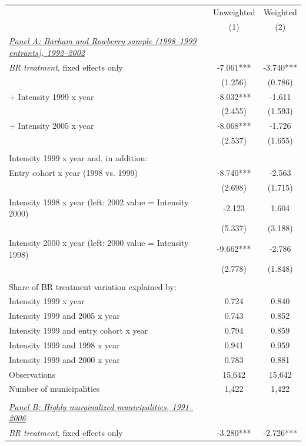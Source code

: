 \begin{tabular}{lcc} \hline \hline
 & Unweighted & Weighted \\ 
 & (1) & (2) \\ \toprule
\underline{\textit{Panel A: Barham and Rowberry sample (1998--1999 entrants), 1992--2002}} \\ 
\textit{BR treatment}, fixed effects only & -7.061*** & -3.740*** \\ 
 & (1.256) & (0.786) \\ 
\quad + Intensity 1999 x year & -8.032*** & -1.611 \\ 
 & (2.455) & (1.593) \\ 
\quad + Intensity 2005 x year & -8.068*** & -1.726 \\ 
 & (2.537) & (1.655) \\ 
  & & \\ 
Intensity 1999 x year and, in addition: & & \\ 
\quad Entry cohort x year (1998 vs. 1999) & -8.740*** & -2.563 \\ 
 & (2.698) & (1.715) \\ 
\quad Intensity 1998 x year (left: 2002 value = Intensity 2000) & -2.123 & 1.604 \\ 
 & (5.337) & (3.188) \\ 
\quad Intensity 2000 x year (left: 2000 value = Intensity 1998) & -9.662*** & -2.786 \\ 
 & (2.778) & (1.848) \\ 
  & & \\ 
Share of BR treatment variation explained by: & & \\ 
\quad Intensity 1999 x year & 0.724 & 0.840 \\ 
\quad Intensity 1999 and 2005 x year & 0.743 & 0.852 \\ 
\quad Intensity 1999 and entry cohort x year & 0.794 & 0.859 \\ 
\quad Intensity 1999 and 1998 x year & 0.941 & 0.959 \\ 
\quad Intensity 1999 and 2000 x year & 0.783 & 0.881 \\ 
Observations & 15,642 & 15,642 \\ 
Number of municipalities & 1,422 & 1,422 \\ 
  & & \\ 
\underline{\textit{Panel B: Highly marginalized municipalities, 1991--2006}} \\ 
\textit{BR treatment}, fixed effects only & -3.280*** & -2.726*** \\ 

\end{tabular}
